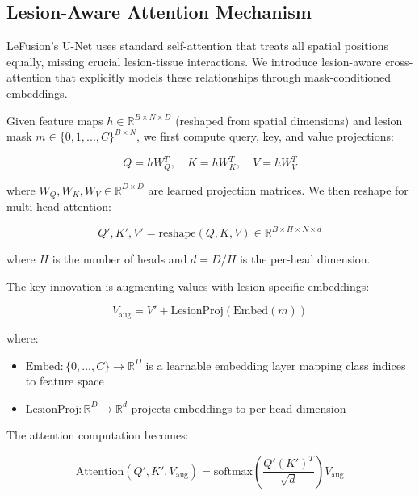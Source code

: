 \documentclass[10pt,twocolumn,letterpaper]{article}
\begin{document}
\subsection{Lesion-Aware Attention Mechanism}

LeFusion's U-Net uses standard self-attention that treats all spatial positions equally, missing crucial lesion-tissue interactions. We introduce lesion-aware cross-attention that explicitly models these relationships through mask-conditioned embeddings.

Given feature maps $h \in \mathbb{R}^{B \times N \times D}$ (reshaped from spatial dimensions) and lesion mask $m \in \{0,1,...,C\}^{B \times N}$, we first compute query, key, and value projections:

\begin{equation}
Q = hW_Q^T, \quad K = hW_K^T, \quad V = hW_V^T
\end{equation}

where $W_Q, W_K, W_V \in \mathbb{R}^{D \times D}$ are learned projection matrices. We then reshape for multi-head attention:

\begin{equation}
Q', K', V' = \text{reshape}(Q, K, V) \in \mathbb{R}^{B \times H \times N \times d}
\end{equation}

where $H$ is the number of heads and $d = D/H$ is the per-head dimension.

The key innovation is augmenting values with lesion-specific embeddings:

\begin{equation}
V_{\text{aug}} = V' + \text{LesionProj}(\text{Embed}(m))
\end{equation}

where:
\begin{itemize}
    \item $\text{Embed}: \{0,...,C\} \rightarrow \mathbb{R}^D$ is a learnable embedding layer mapping class indices to feature space
    \item $\text{LesionProj}: \mathbb{R}^D \rightarrow \mathbb{R}^d$ projects embeddings to per-head dimension
\end{itemize}

The attention computation becomes:

\begin{equation}
\text{Attention}(Q', K', V_{\text{aug}}) = \text{softmax}\left(\frac{Q'(K')^T}{\sqrt{d}}\right)V_{\text{aug}}
\end{equation}
\end{document}
